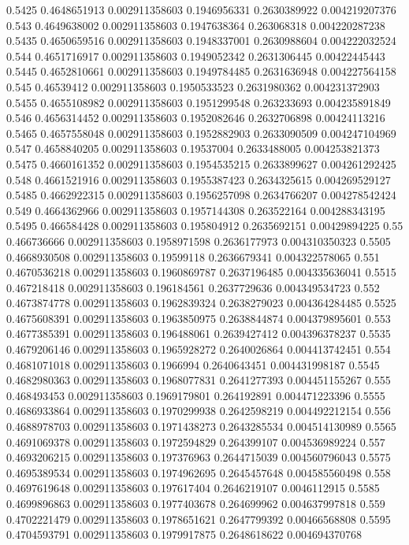 {0.5425 0.4648651913 0.002911358603 0.1946956331 0.2630389922 0.004219207376
0.543 0.4649638002 0.002911358603 0.1947638364 0.263068318 0.004220287238
0.5435 0.4650659516 0.002911358603 0.1948337001 0.2630988604 0.004222032524
0.544 0.4651716917 0.002911358603 0.1949052342 0.2631306445 0.00422445443
0.5445 0.4652810661 0.002911358603 0.1949784485 0.2631636948 0.004227564158
0.545 0.46539412 0.002911358603 0.1950533523 0.2631980362 0.004231372903
0.5455 0.4655108982 0.002911358603 0.1951299548 0.263233693 0.004235891849
0.546 0.4656314452 0.002911358603 0.1952082646 0.2632706898 0.00424113216
0.5465 0.4657558048 0.002911358603 0.1952882903 0.2633090509 0.004247104969
0.547 0.4658840205 0.002911358603 0.19537004 0.2633488005 0.004253821373
0.5475 0.4660161352 0.002911358603 0.1954535215 0.2633899627 0.004261292425
0.548 0.4661521916 0.002911358603 0.1955387423 0.2634325615 0.004269529127
0.5485 0.4662922315 0.002911358603 0.1956257098 0.2634766207 0.004278542424
0.549 0.4664362966 0.002911358603 0.1957144308 0.263522164 0.004288343195
0.5495 0.466584428 0.002911358603 0.195804912 0.2635692151 0.00429894225
0.55 0.466736666 0.002911358603 0.1958971598 0.2636177973 0.004310350323
0.5505 0.4668930508 0.002911358603 0.19599118 0.2636679341 0.004322578065
0.551 0.4670536218 0.002911358603 0.1960869787 0.2637196485 0.004335636041
0.5515 0.467218418 0.002911358603 0.196184561 0.2637729636 0.004349534723
0.552 0.4673874778 0.002911358603 0.1962839324 0.2638279023 0.004364284485
0.5525 0.4675608391 0.002911358603 0.1963850975 0.2638844874 0.004379895601
0.553 0.4677385391 0.002911358603 0.196488061 0.2639427412 0.004396378237
0.5535 0.4679206146 0.002911358603 0.1965928272 0.2640026864 0.004413742451
0.554 0.4681071018 0.002911358603 0.1966994 0.2640643451 0.004431998187
0.5545 0.4682980363 0.002911358603 0.1968077831 0.2641277393 0.004451155267
0.555 0.468493453 0.002911358603 0.1969179801 0.264192891 0.004471223396
0.5555 0.4686933864 0.002911358603 0.1970299938 0.2642598219 0.004492212154
0.556 0.4688978703 0.002911358603 0.1971438273 0.2643285534 0.004514130989
0.5565 0.4691069378 0.002911358603 0.1972594829 0.264399107 0.004536989224
0.557 0.4693206215 0.002911358603 0.197376963 0.2644715039 0.004560796043
0.5575 0.4695389534 0.002911358603 0.1974962695 0.2645457648 0.004585560498
0.558 0.4697619648 0.002911358603 0.197617404 0.2646219107 0.0046112915
0.5585 0.4699896863 0.002911358603 0.1977403678 0.264699962 0.004637997818
0.559 0.4702221479 0.002911358603 0.1978651621 0.2647799392 0.00466568808
0.5595 0.4704593791 0.002911358603 0.1979917875 0.2648618622 0.004694370768
}
